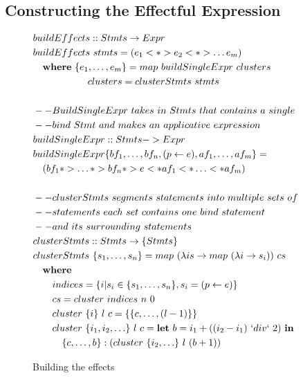 \subsection{Constructing the Effectful Expression}
\begin{figure}[t]
\begin{math}
\begin{aligned}
&buildEffects :: Stmts \rightarrow Expr&\\
&buildEffects\ stmts = (e_1 <*> e_2 <*> \ldots e_m)\\
&\quad \textbf{where}\ \{e_1, \ldots, e_m \} = map\ buildSingleExpr\ clusters\\
&\qquad \quad \quad \quad\ \ clusters = clusterStmts\ stmts\\
\\
&--BuildSingleExpr\ takes\ in\ Stmts\ that\ contains\ a\ single\\
&--bind\ Stmt\ and\ makes\ an\ applicative\ expression\\
&buildSingleExpr :: Stmts -> Expr\\
&buildSingleExpr \{bf_1, \ldots, bf_n, (p \leftarrow e), af_1, \ldots, af_m\} = \\
&\quad(bf_1 *> \ldots *> bf_n *> e <* af_1 <* \ldots <* af_m)\\
\\
&--clusterStmts\ segments\ statements\ into\ multiple\ sets\ of\\
&--statements\ each\ set\ contains\ one\ bind\ statement\\
&--and\ its\ surrounding\ statements\\
&clusterStmts :: Stmts \rightarrow \{Stmts\}\\
&clusterStmts\ \{s_1, \ldots, s_n \} = map\ (\lambda is \rightarrow map\ (\lambda i \rightarrow s_i))\ cs\\
&\quad \textbf{where}\\
&\qquad indices = \{i | s_i \in \{s_1, \ldots, s_n\}, s_i = (p \leftarrow e)\}\\
&\qquad cs = cluster\ indices\ n\ 0\\
&\qquad cluster\ \{i\}\ l\ c = \{\{c, \ldots, (l-1)\}\}\\
&\qquad cluster\ \{i_1,i_2,\ldots \}\ l\ c = \textbf{let}\ b = i_1 + ((i_2-i_1)\ `div`\ 2)\ \textbf{in}\\
&\qquad \quad \{c, \ldots, b\}:(cluster\ \{i_2, \ldots \}\ l\ (b+1))
\end{aligned}
\end{math}
\caption{Building the effects}
\label{effects}
\end{figure}


